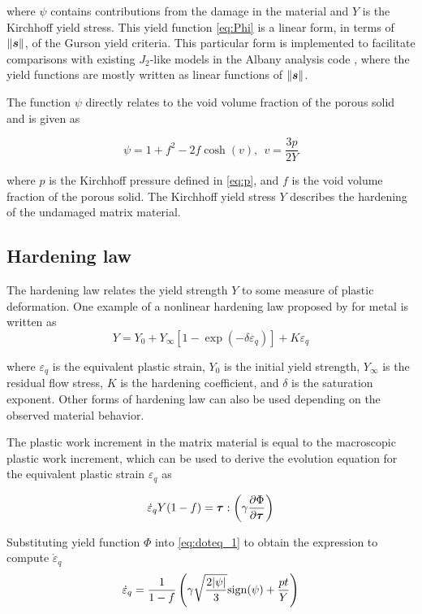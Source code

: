 where $\psi$ contains contributions from the damage in the material
and $Y$ is the Kirchhoff yield stress. This yield function
\eqref{eq:Phi} is a linear form, in terms of $\|{\boldsymbol{s}}\|$, of the Gurson
yield criteria. This particular form is implemented to facilitate
comparisons with existing $J_2$-like models in the Albany analysis
code \cite{Salinger2013}, where the yield functions are mostly written
as linear functions of $\|{\boldsymbol{s}}\|$.

The function $\psi$ directly relates to the void volume fraction of
the porous solid and is given as

\begin{equation}
\psi = 1 + f^2 - 2 f \cosh(v), ~~v=\frac{3p}{2 Y}
\end{equation}

where $p$ is the Kirchhoff pressure defined in \eqref{eq:p}, and $f$
is the void volume fraction of the porous solid. The Kirchhoff yield
stress $Y$ describes the hardening of the undamaged matrix material.

\subsection{Hardening law}
The hardening law relates the yield strength $Y$ to some measure of
plastic deformation. One example of a nonlinear hardening law proposed
by \cite{SimoHughes:98} for metal is written as
\begin{equation}
Y = Y_0 + Y_{\infty}\left[ 1-\exp(-\delta\varepsilon_q)\right] +
K\varepsilon_q
\end{equation}

where $\varepsilon_q$ is the equivalent plastic strain, $Y_0$ is the
initial yield strength, $Y_{\infty}$ is the residual flow stress, $K$
is the hardening coefficient, and $\delta$ is the saturation
exponent. Other forms of hardening law can also be used depending on
the observed material behavior.

The plastic work increment in the matrix material is equal to the
macroscopic plastic work increment, which can be used to derive the
evolution equation for the equivalent plastic strain $\varepsilon_q$
as

\begin{equation}\label{eq:doteq_1}
\dot{\varepsilon}_q Y(1-f) = {\boldsymbol{\tau}} : \left(
\gamma\frac{\partial\Phi}{\partial{\boldsymbol{\tau}}} \right)
\end{equation}

Substituting yield function $\Phi$ into \eqref{eq:doteq_1} to obtain
the expression to compute $\dot{\varepsilon}_q$
\begin{equation}\label{eq:doteq}
  \dot{\varepsilon}_q =\frac{1}{1-f}\left(
  \gamma\sqrt{\frac{2|\psi|}{3}} {\rm sign}(\psi) + \frac{p t}{Y}
  \right)
\end{equation}

